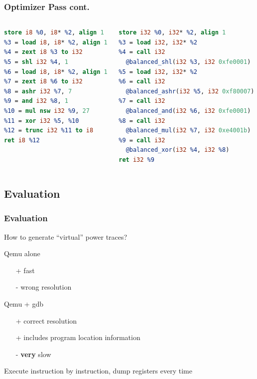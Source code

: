 \documentclass[11pt,t,usepdftitle=false,aspectratio=169]{beamer}
\begin{document}
\begin{frame}[fragile]
  \frametitle{Optimizer Pass cont.}
  \begin{columns}[T]
    \begin{column}{0.4\textwidth}
      \begin{lstlisting}[language=LLVM, basicstyle=\small]
%2 = alloca i8, align 1
store i8 %0, i8* %2, align 1
%3 = load i8, i8* %2, align 1
%4 = zext i8 %3 to i32
%5 = shl i32 %4, 1
%6 = load i8, i8* %2, align 1
%7 = zext i8 %6 to i32
%8 = ashr i32 %7, 7
%9 = and i32 %8, 1
%10 = mul nsw i32 %9, 27
%11 = xor i32 %5, %10
%12 = trunc i32 %11 to i8
ret i8 %12
      \end{lstlisting}
    \end{column}
    \vrule
    \hfill
    \begin{column}{0.48\textwidth}
      \begin{lstlisting}[language=LLVM, basicstyle=\small]
%2 = alloca i32
store i32 %0, i32* %2, align 1
%3 = load i32, i32* %2
%4 = call i32
  @balanced_shl(i32 %3, i32 0xfe0001)
%5 = load i32, i32* %2
%6 = call i32
  @balanced_ashr(i32 %5, i32 0xf80007)
%7 = call i32
  @balanced_and(i32 %6, i32 0xfe0001)
%8 = call i32
  @balanced_mul(i32 %7, i32 0xe4001b)
%9 = call i32
  @balanced_xor(i32 %4, i32 %8)
ret i32 %9
      \end{lstlisting}
    \end{column}
  \end{columns}
\end{frame}


\subsection{Evaluation}
\begin{frame}
  \frametitle{Evaluation}

  How to generate ``virtual'' power traces?
  
  \begin{block}{Qemu alone}
    \begin{itemize}
    \item[+] fast
    \item[-] wrong resolution
    \end{itemize}
  \end{block}

  \begin{alertblock}{Qemu + gdb}
    \begin{itemize}
    \item[+] correct resolution
    \item[+] includes program location information
    \item[-] \textbf{very} slow
    \end{itemize}
    Execute instruction by instruction, dump registers every time
  \end{alertblock}
\end{frame}
\end{document}
